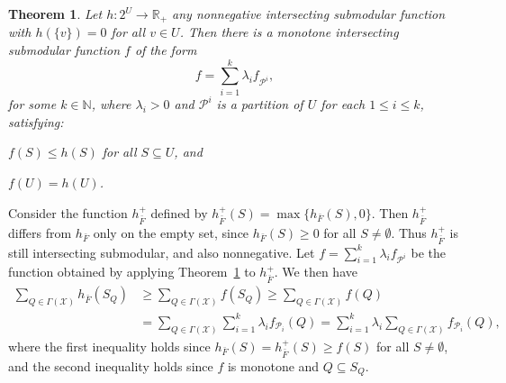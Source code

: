 \documentclass[11pt, letterpaper]{article}
\newtheorem{theorem}{Theorem}[section]
\theoremstyle{definition}
\newcommand{\grphx}{\mathcal{X}}
\newcommand{\compof}[1]{\Gamma(#1)}
\newcommand{\compx}{\compof{\grphx}}
\newcommand{\slkF}{h_{\bar{F}}}
\newcommand{\naturals}{\mathbb{N}}
\begin{document}
\begin{theorem}\label{thm:submLowerBound}
Let $h:2^U\rightarrow \mathbb{R}_+$ any nonnegative
intersecting submodular function with $h(\{v\}) = 0$ for all $v \in U$. 
Then there is a monotone intersecting submodular
function $f$ of the form
\begin{equation*}
f = \sum_{i=1}^k \lambda_i f_{\mathcal{P}^i},
\end{equation*}
for some $k \in \naturals$, where $\lambda_i> 0$ and $\mathcal{P}^i$ is a partition of $U$ for each $1 \leq i \leq k$, satisfying:
\begin{compactenum}[i)]
\item\label{item:lowerBounda} $f(S) \leq h(S)$ for all $S\subseteq U$, and
\item\label{item:matchRa} $f(U)=h(U)$.
\end{compactenum}
\end{theorem}
Consider the function $\slkF^+$ defined by $\slkF^+(S) = \max\{\slkF(S), 0\}$.
Then $\slkF^+$ differs from $\slkF$ only on the empty set, since $\slkF(S) \geq 0$ for all $S \neq \emptyset$.
Thus $\slkF^+$ is still intersecting submodular, and also nonnegative.
Let $f=\sum_{i=1}^k \lambda_i f_{\mathcal{P}^i}$ be the function
obtained by applying Theorem~\ref{thm:submLowerBound} to $\slkF^+$.
We then have
\begin{equation}\label{eq:beforePartArg}
\begin{aligned}
\sum_{Q\in \compx} \slkF(S_Q)
&\geq \sum_{Q\in \compx} f(S_Q)
\geq \sum_{Q\in \compx} f(Q)\\
&=\sum_{Q\in \Gamma(\mathcal{X})} \sum_{i=1}^k \lambda_if_{\mathcal{P}_i}(Q)
= \sum_{i=1}^k \lambda_i \sum_{Q\in \Gamma(\mathcal{X})}f_{\mathcal{P}_i}(Q),
\end{aligned}
\end{equation}
where the first inequality holds since $\slkF(S) = \slkF^+(S) \geq f(S)$ for all $S \neq \emptyset$, and
the second inequality holds since $f$ is monotone and $Q\subseteq S_Q$.
\end{document}
